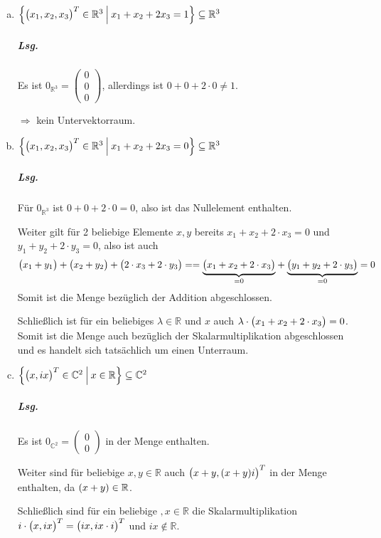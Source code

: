 \documentclass{scrreprt}
\begin{document}
\begin{enumerate}[(a)]
\item $\qty{\qty\big(x_1, x_2, x_3)^T \in \mathbb{R}^3 \:\middle|\: x_1 + x_2 + 2x_3 = 1} \subseteq \mathbb{R}^3$

  \subparagraph{Lsg.} Es ist
  $0_{\mathbb{R}^3} = \begin{pmatrix} 0 \\ 0 \\ 0 \end{pmatrix}$, allerdings ist
  $0 + 0 + 2 \cdot 0 \ne 1$.

  $\Rightarrow$ kein Untervektorraum.

\item $\qty{\qty\big(x_1, x_2, x_3)^T \in \mathbb{R}^3 \:\middle|\: x_1 + x_2 + 2x_3 = 0} \subseteq \mathbb{R}^3$

  \subparagraph{Lsg.} Für $0_{\mathbb{R}^3}$ ist $0 + 0 + 2 \cdot 0 = 0$, also
  ist das Nullelement enthalten.

  Weiter gilt für 2 beliebige Elemente $x, y$ bereits
  $x_1 + x_2 + 2 \cdot x_3 = 0$ und $y_1 + y_2 + 2 \cdot y_3 = 0$,
  also ist auch
  \[
    \qty\big(x_1 + y_1) + \qty\big(x_2 + y_2) + \qty\big(2 \cdot x_3 + 2 \cdot y_3) =
    = \underset{= 0}{\underbrace{\qty\big(x_1 + x_2 + 2 \cdot x_3)}} +
    \underset{= 0}{\underbrace{\qty\big(y_1 + y_2 + 2 \cdot y_3)}} = 0
  \]
  Somit ist die Menge bezüglich der Addition abgeschlossen.

  Schließlich ist für ein beliebiges $\lambda \in \mathbb{R}$ und $x$ auch
  $\lambda \cdot \qty\big(x_1 + x_2 + 2 \cdot x_3) = 0$.
  Somit ist die Menge auch bezüglich der Skalarmultiplikation abgeschlossen
  und es handelt sich tatsächlich um einen Unterraum.

\newpage
\item $\qty{\qty\big(x, ix)^T \in \mathbb{C}^2 \:\middle|\: x \in \mathbb{R}} \subseteq \mathbb{C}^2$

  \subparagraph{Lsg.} Es ist
  $0_{\mathbb{C}^2} = \begin{pmatrix} 0 \\ 0 \end{pmatrix}$ in der Menge
  enthalten.

  Weiter sind für beliebige $x, y \in \mathbb{R}$ auch
  $\qty\big(x + y, \qty(x + y)i)^T$ in der Menge enthalten, da
  $\qty(x + y) \in \mathbb{R}$.

  Schließlich sind für ein beliebige $, x \in \mathbb{R}$ die Skalarmultiplikation
  $i \cdot \qty\big(x, ix)^T = \qty\big(ix, ix \cdot i)^T$
  und $ix \notin \mathbb{R}$.


\end{enumerate}
\end{document}
